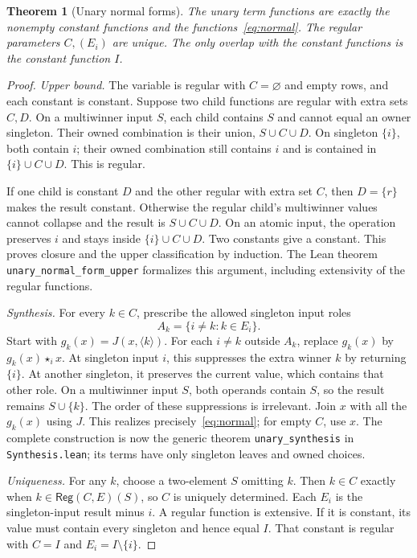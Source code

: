 \documentclass[11pt]{article}
\newtheorem{theorem}{Theorem}[section]
\newcommand{\at}[1]{\langle #1\rangle}
\newcommand{\ow}[1]{\mathbin{\star_{#1}}}
\begin{document}
\begin{theorem}[Unary normal forms]\label{thm:unary}
The unary term functions are exactly the nonempty constant functions and
the functions~\eqref{eq:normal}. The regular parameters $C,(E_i)$ are
unique. The only overlap with the constant functions is the constant
function $I$.
\end{theorem}
\begin{proof}
\emph{Upper bound.} The variable is regular with $C=\varnothing$ and
empty rows, and each constant is constant. Suppose two child functions
are regular with extra sets $C,D$. On a multiwinner input $S$, each child
contains $S$ and cannot equal an owner singleton. Their owned combination
is their union, $S\cup C\cup D$. On singleton $\{i\}$, both contain $i$;
their owned combination still contains $i$ and is contained in
$\{i\}\cup C\cup D$. This is regular.

If one child is constant $D$ and the other regular with extra set $C$,
then $D=\{r\}$ makes the result constant. Otherwise the regular child's
multiwinner values cannot collapse and the result is $S\cup C\cup D$.
On an atomic input, the operation preserves $i$ and stays inside
$\{i\}\cup C\cup D$. Two constants give a constant. This proves closure
and the upper classification by induction. The Lean theorem
\texttt{unary\_normal\_form\_upper} formalizes this argument, including
extensivity of the regular functions.

\emph{Synthesis.} For every $k\in C$, prescribe the allowed singleton
input roles
\[
 A_k=\{i\ne k:k\in E_i\}.
\]
Start with $g_k(x)=J(x,\at k)$. For each $i\ne k$ outside $A_k$, replace
$g_k(x)$ by $g_k(x)\ow i x$. At singleton input $i$, this suppresses the
extra winner $k$ by returning $\{i\}$. At another singleton, it preserves
the current value, which contains that other role. On a multiwinner
input $S$, both operands contain $S$, so the result remains $S\cup\{k\}$.
The order of these suppressions is irrelevant. Join $x$ with all the
$g_k(x)$ using $J$. This realizes precisely~\eqref{eq:normal}; for empty
$C$, use $x$. The complete construction is now the generic theorem
\texttt{unary\_synthesis} in \texttt{Synthesis.lean}; its terms have only
singleton leaves and owned choices.

\emph{Uniqueness.} For any $k$, choose a two-element $S$ omitting $k$.
Then $k\in C$ exactly when $k\in\mathsf{Reg}(C,E)(S)$, so $C$ is uniquely
determined. Each $E_i$ is the singleton-input result minus $i$. A regular
function is extensive. If it is constant, its value must contain every
singleton and hence equal $I$. That constant is regular with $C=I$ and
$E_i=I\setminus\{i\}$.
\end{proof}
\end{document}
